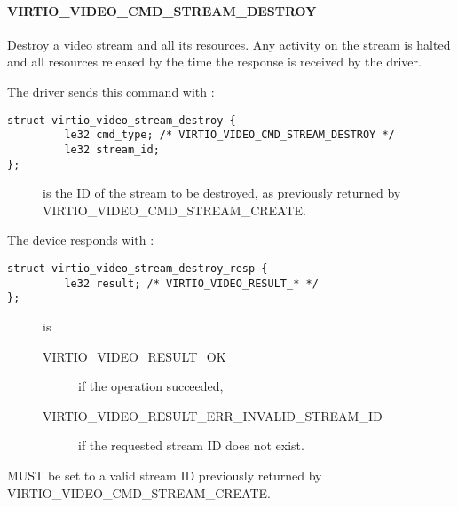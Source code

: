 \paragraph{VIRTIO_VIDEO_CMD_STREAM_DESTROY}\label{sec:Device Types / Video Device / Device Operation / Device Operation: Stream commands / VIRTIO_VIDEO_CMD_STREAM_DESTROY}

Destroy a video stream and all its resources. Any activity on the stream
is halted and all resources released by the time the response is
received by the driver.

The driver sends this command with
:

\begin{lstlisting}
struct virtio_video_stream_destroy {
         le32 cmd_type; /* VIRTIO_VIDEO_CMD_STREAM_DESTROY */
         le32 stream_id;
};
\end{lstlisting}

\begin{description}
\item[]
is the ID of the stream to be destroyed, as previously returned by
VIRTIO\_VIDEO\_CMD\_STREAM\_CREATE.
\end{description}

The device responds with
:

\begin{lstlisting}
struct virtio_video_stream_destroy_resp {
         le32 result; /* VIRTIO_VIDEO_RESULT_* */
};
\end{lstlisting}

\begin{description}
\item[]
is

\begin{description}
\item[VIRTIO\_VIDEO\_RESULT\_OK]
if the operation succeeded,
\item[VIRTIO\_VIDEO\_RESULT\_ERR\_INVALID\_STREAM\_ID]
if the requested stream ID does not exist.
\end{description}
\end{description}


 MUST be set to a valid stream ID previously returned
by VIRTIO\_VIDEO\_CMD\_STREAM\_CREATE.

